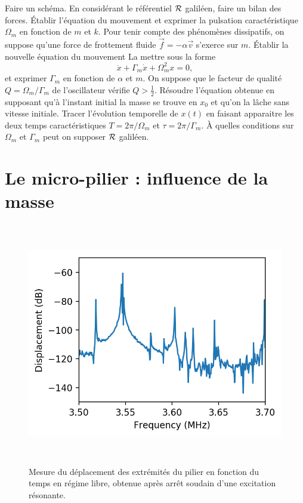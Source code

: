\documentclass[12pt,a4paper]{exam}
\begin{document}
\begin{questions}
\question Faire un schéma.
\question En considérant le référentiel $\cal{R}$ galiléen, faire un bilan des forces.
\question Établir l'équation du mouvement et exprimer la pulsation caractéristique $\Omega_m$ en fonction de $m$ et $k$.
\question Pour tenir compte des phénomènes dissipatifs, on suppose qu'une force de frottement fluide $\overrightarrow{f}=-\alpha\overrightarrow{v}$ s'exerce sur $m$.
Établir la nouvelle équation du mouvement
\question La mettre sous la forme
\begin{equation}
\ddot{x} + \Gamma_m \dot{x} + \Omega_m^2 x = 0,
\label{eq:damped_oscillator}
\end{equation}
et exprimer $\Gamma_m$ en fonction de $\alpha$ et $m$.
\question On suppose que le facteur de qualité $Q=\Omega_m/\Gamma_m$ de l'oscillateur vérifie $Q>\frac{1}{2}$.
Résoudre l'équation obtenue en supposant qu'à l'instant initial la masse se trouve en $x_0$ et qu'on la lâche sans vitesse initiale.
\question Tracer l'évolution temporelle de $x(t)$ en faisant apparaitre les deux temps caractéristiques $T=2\pi/\Omega_m$ et $\tau=2\pi/\Gamma_m$.
\question À quelles conditions sur $\Omega_m$ et $\Gamma_m$ peut on supposer $\cal{R}$ galiléen.
\end{questions}

\section{Le micro-pilier : influence de la masse}

\begin{figure}
\center
\includegraphics[height=300pt]{figures/broadband_driven_response.png}
\caption{Mesure du déplacement des extrémités du pilier en fonction du temps en régime libre, obtenue après arrêt soudain d'une excitation résonante.}
\label{fig:ringdown}
\end{figure}
\end{document}
